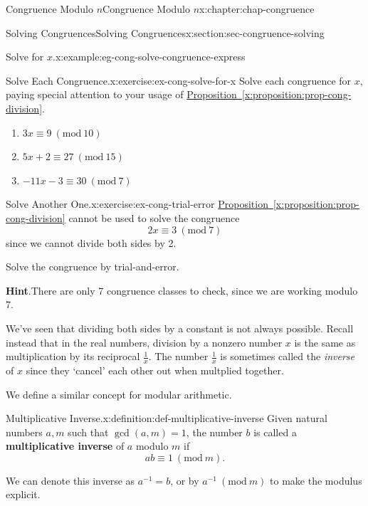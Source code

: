 \documentclass[oneside,10pt,]{book}
\newcommand{\blocktitlefont}{\relax}
\newcommand{\xreffont}{\relax}
\newcommand{\terminology}[1]{\textbf{#1}}
\numberwithin{equation}{section}
\newcommand{\Mod}[1]{\ \left(\mathrm{mod}\ #1\right)}
\begin{document}
\begin{chapterptx}{Congruence Modulo \(n\)}{}{Congruence Modulo \(n\)}{}{}{x:chapter:chap-congruence}
\begin{sectionptx}{Solving Congruences}{}{Solving Congruences}{}{}{x:section:sec-congruence-solving}
\begin{example}{Solve for \(x\).}{x:example:eg-cong-solve-congruence-express}
\end{example}
\begin{inlineexercise}{Solve Each Congruence.}{x:exercise:ex-cong-solve-for-x}%
Solve each congruence for \(x\), paying special attention to your usage of \hyperref[x:proposition:prop-cong-division]{Proposition~{\xreffont\ref{x:proposition:prop-cong-division}}}.%
\begin{enumerate}[label=(\alph*)]
\item{}\(\displaystyle 3x \equiv 9 \Mod{10}\)%
\item{}\(\displaystyle 5x + 2 \equiv 27 \Mod{15}\)%
\item{}\(\displaystyle -11x - 3 \equiv 30 \Mod{7}\)%
\end{enumerate}
%
\end{inlineexercise}
\begin{inlineexercise}{Solve Another One.}{x:exercise:ex-cong-trial-error}%
\hyperref[x:proposition:prop-cong-division]{Proposition~{\xreffont\ref{x:proposition:prop-cong-division}}} cannot be used to solve the congruence%
\begin{equation*}
2x \equiv 3 \Mod{7}
\end{equation*}
since we cannot divide both sides by 2.%
\par
Solve the congruence by trial-and-error.%
\par\smallskip%
\noindent\textbf{\blocktitlefont Hint}.\hypertarget{g:hint:id443380}{}\quad{}There are only 7 congruence classes to check, since we are working modulo 7.%
\end{inlineexercise}
We've seen that dividing both sides by a constant is not always possible. Recall instead that in the real numbers, division by a nonzero number \(x\) is the same as multiplication by its reciprocal \(\frac{1}{x}\). The number \(\frac{1}{x}\) is sometimes called the \emph{inverse} of \(x\) since they `cancel' each other out when multplied together.%
\par
We define a similar concept for modular arithmetic.%
\begin{definition}{Multiplicative Inverse.}{x:definition:def-multiplicative-inverse}%
Given natural numbers \(a, m\) such that \(\gcd(a,m) = 1\), the number \(b\) is called a \terminology{multiplicative inverse} of \(a\) modulo \(m\) if%
\begin{equation*}
ab \equiv 1 \Mod{m}\text{.}
\end{equation*}
%
\par
We can denote this inverse as \(a^{-1} = b\), or by \(a^{-1} \Mod{m}\) to make the modulus explicit.%

\end{definition}
\end{sectionptx}
\end{chapterptx}
\end{document}
